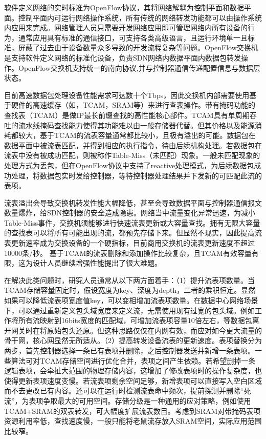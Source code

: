 






软件定义网络的实时标准为OpenFlow协议，其将网络解耦为控制平面和数据平面。控制平面内可运行网络操作系统，所有传统的网络转发功能都可以由操作系统内应用来完成。网络管理人员只需要开发网络应用即可管理网络内所有设备的行为，通常应用具有标准的通信接口，可支持各类高级语言，且运行环境单一且标准，屏蔽了过去由于设备数量众多导致的开发流程复杂等问题。OpenFlow交换机是支持软件定义网络的标准化设备，负责SDN网络内数据平面内数据包转发操作。OpenFlow交换机支持统一的南向协议,并与控制器通信传递配置信息与数据层状态。

目前高速数据包处理设备性能需求可达数十个Tbps，因此交换机内部需要使用基于硬件的高速缓存（如，TCAM，SRAM等）来进行查表操作。带有掩码功能的查找表（TCAM）是做IP最长前缀查找的高性能核心部件。TCAM具有单周期吞吐的流水线掩码查找能力使得其功能难以由一般存储器代替。但其价格以及能源消耗都较大，基于TCAM的流表容量通常都比较小，且极有溢出的可能。数据包在数据平面中被流表匹配，并得到相应的执行指令，待由后续机构处理。若数据包在流表中没有被成功匹配，则被称作Table-Miss（未匹配）现象。一般未匹配现象的处理方式为丢包，但在OpenFlow协议中支持了reactive处理模式，为后续数据包成功处理，将数据包实时发给控制器，等待控制器处理结果并下发新的可匹配此流的表项。

流表溢出会导致交换机转发性能大幅降低，甚至会导致数据平面与控制器通信报文数量爆炸，给SDN控制器的安全造成隐患。网络当中流量变化异常迅速，为减小Table-Miss事件，交换机须能够进行快速流表更新或大容量查找。拥有无限大容量的查找表可以将所有可能出现的流，都预先存储下来。但显然不现实，因此提高流表更新速率成为交换设备的一个硬指标，目前商用交换机的流表更新速度不超过10000条/秒。
基于TCAM的流表删除和添加操作比较复杂，且TCAM有效容量有限，这为设计人员继续增强性能提出了很大难题。

在解决此类问题时，研究人员通常从以下两方面着手：（1）提升流表项数量。当TCAM存储容量固定时，假设宽度为key、深度为depth，二者的乘积恒定。显然如果可以降低流表项宽度值key，可以变相增加流表项数量。在数据中心网络场景下，可以通过重新定义包头域宽度来定义流，无需使用现有过宽的包头域。例如工作将所有流映射到16bits宽度的匹配域，可增加流表项容量10倍左右，等数据包离开网关时在将原始包头还原。但这种思路仅仅在内网有效，而应对如今更大流量的骨干网，核心网显然无所适从。（2）提高转发设备流表的更新速度。表项替换分为两步，首先控制器选择一条已有表项并删除，之后控制器发送并新增一条表项。一些算法可对TCAM存储空间进行优化合并，表项之间产生依赖。若希望删掉一条逻辑表项，会牵扯大范围的物理存储内容，这增加了修改表项时的操作复杂度，也使得更新表项速度变慢。若流表项剩余空间足够，新增表项可以直接写入空白区域而不去更改已有内容。还可以在运行时检测流表命中频次，提前探测并删除“死流”，为表项争取最大的可用空间。存储分级是一种通用的应对策略，例如使用TCAM+SRAM的双表转发，可大幅度扩展流表数目。考虑到SRAM对带掩码表项资源利用率低，查找速度慢，一般只能将老鼠流存放入SRAM空间，实际应用范围比较窄。

